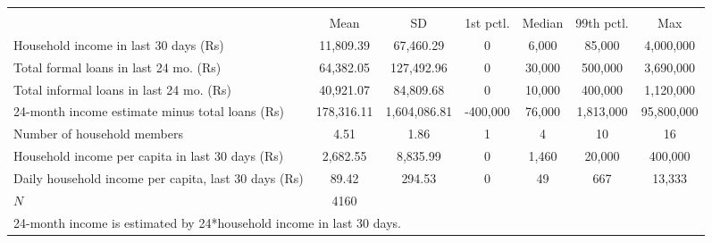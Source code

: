 {
\def\sym#1{\ifmmode^{#1}\else\(^{#1}\)\fi}
\begin{tabular}{l*{1}{cccccc}}
\hline\hline
            &\multicolumn{6}{c}{}                                                         \\
            &        Mean&          SD&   1st pctl.&      Median&  99th pctl.&         Max\\
\hline
Household income in last 30 days (Rs)&   11,809.39&   67,460.29&           0&       6,000&      85,000&   4,000,000\\
Total formal loans in last 24 mo. (Rs)&   64,382.05&  127,492.96&           0&      30,000&     500,000&   3,690,000\\
Total informal loans in last 24 mo. (Rs)&   40,921.07&   84,809.68&           0&      10,000&     400,000&   1,120,000\\
24-month income estimate minus total loans (Rs)&  178,316.11&1,604,086.81&    -400,000&      76,000&   1,813,000&  95,800,000\\
Number of household members&        4.51&        1.86&           1&           4&          10&          16\\
Household income per capita in last 30 days (Rs)&    2,682.55&    8,835.99&           0&       1,460&      20,000&     400,000\\
Daily household income per capita, last 30 days (Rs)&       89.42&      294.53&           0&          49&         667&      13,333\\
\hline
\(N\)       &        4160&            &            &            &            &            \\
\hline\hline
\multicolumn{7}{l}{\footnotesize 24-month income is estimated by 24*household income in last 30 days.}\\
\end{tabular}
}
